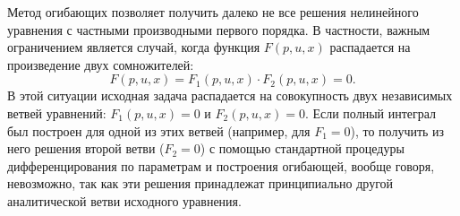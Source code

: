 \begin{note}
  Метод огибающих позволяет получить далеко не все решения нелинейного 
  уравнения с частными производными первого порядка. 
  В частности, важным ограничением является случай, когда функция 
  $F(p, u, x)$ распадается на произведение двух сомножителей:
  \begin{equation}
      F(p, u, x) = F_1(p, u, x) \cdot F_2(p, u, x) = 0.
  \end{equation}
  В этой ситуации исходная задача распадается на совокупность двух 
  независимых ветвей уравнений: $F_1(p, u, x) = 0$ и $F_2(p, u, x) = 0$. 
  Если полный интеграл был построен для одной из этих ветвей
  (например, для $F_1 = 0$), то получить из него решения второй ветви 
  ($F_2 = 0$) с помощью стандартной процедуры дифференцирования по 
  параметрам и построения огибающей, вообще говоря, невозможно, 
  так как эти решения принадлежат принципиально другой аналитической 
  ветви исходного уравнения.
\end{note}
